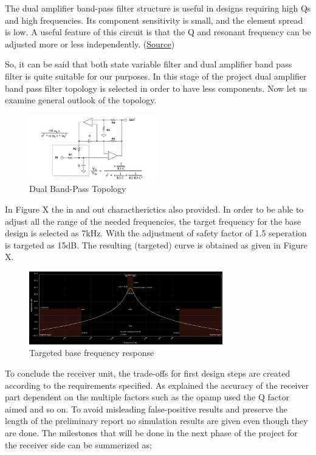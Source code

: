 \documentclass[letterpaper,12pt]{article}
\begin{document}
The dual amplifier band-pass filter structure is useful in designs requiring high Qs and high frequencies. Its component sensitivity is small, and the element spread is low. A useful feature of this circuit is that the Q and resonant frequency can be adjusted more or less independently. (\href{https://www.analog.com/media/en/training-seminars/tutorials/MT-209.pdf}{Source})

\vspace{2mm}
So, it can be said that both state variable filter and dual amplifier band pass filter is quite suitable for our purposes. In this stage of the project dual amplifier band pass filter topology is selected in order to have less components. Now let us examine general outlook of the topology.
\begin{figure}[H]
    \centering
    \includegraphics[width = 0.5\textwidth]{dualbandpass.png}
    \caption{Dual Band-Pass Topology}
\end{figure} 
In Figure X the in and out charactherictics also provided. In order to be able to adjust all the range of the needed frequencies, the target frequency for the base design is selected as 7kHz. With the adjustment of safety factor of 1.5 seperation is targeted as 15dB. The resulting (targeted) curve is obtained as given in Figure X.
\begin{figure}[H]
    \centering
    \includegraphics[width = 0.75\textwidth]{response.png}
    \caption{Targeted base frequency response}
\end{figure} 
To conclude the receiver unit, the trade-offs for first design steps are created according to the requirements specified. As explained the accuracy of the receiver part dependent on the multiple factors such as the opamp used the Q factor aimed and so on. To avoid misleading false-positive results and preserve the length of the preliminary report no simulation results are given even though they are done. The milestones that will be done in the next phase of the project for the receiver side can be summerized as;
\end{document}
